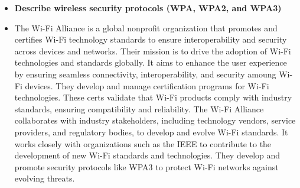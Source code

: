 \documentclass{article}
\begin{document}
\begin{itemize}
  \item \textbf{Describe wireless security protocols (WPA, WPA2, and WPA3)}
  	\item[] The Wi-Fi Alliance is a global nonprofit organization that promotes and certifies Wi-Fi technology standards to ensure interoperability and security across devices and networks. Their mission is to drive the adoption of Wi-Fi technologies and standards globally. It aims to enhance the user experience by ensuring seamless connectivity, interoperability, and security amoung Wi-Fi devices. They develop and manage certification programs for Wi-Fi technologies. These certs validate that Wi-Fi products comply with industry standards, ensuring compatibility and reliability. The Wi-Fi Alliance collaborates with industry stakeholders, including technology vendors, service providers, and regulatory bodies, to develop and evolve Wi-Fi standards. It works closely with organizations such as the IEEE to contribute to the development of new Wi-Fi standards and technologies. They develop and promote security protocols like WPA3 to protect Wi-Fi networks against evolving threats.


\end{itemize}
\end{document}
